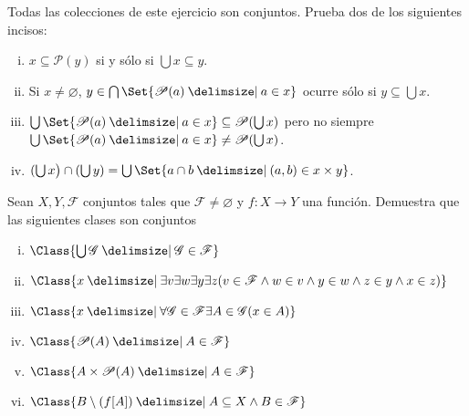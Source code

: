 \documentclass[10pt]{article}
\providecommand\st{}
\newcommand\SetSymbol[1][]{%
    \nonscript\:#1\vert
    \allowbreak
    \nonscript\:
    \mathopen{}}
\renewcommand\st{\SetSymbol[\delimsize]}
\renewcommand\st{\SetSymbol[\delimsize]}
\newcommand{\ms}[1]{\mathscr{#1}}
\renewcommand{\emptyset}{\varnothing}
\begin{document}
    \begin{exercise}
        Todas las colecciones de este ejercicio son conjuntos. Prueba dos de los siguientes incisos:
        \begin{enumerate}[i)]
            \item \(x \subseteq \ms{P}(y)\) si y sólo si \(\bigcup x \subseteq y\).
            \item Si \(x \neq \emptyset\), \(y \in \bigcap\Set{\ms{P}(a) \st a \in x}\) ocurre sólo si \(y \subseteq \bigcup x\).
            \item \( \bigcup \Set{ \ms{P}(a) \st a \in x } \subseteq \ms{P}(\bigcup x) \) pero no siempre \( \bigcup \Set{ \ms{P}(a) \st a \in x } \neq \ms{P}(\bigcup x) \).
            \item \( ( \bigcup x \big) \cap ( \bigcup y ) = \bigcup \Set{ a \cap b \st (a,b) \in x \times y } \).
        \end{enumerate}
    \end{exercise}

    \begin{exercise}
        Sean $X,Y, \ms{F}$ conjuntos tales que $\ms{F}\neq \emptyset$ y $f\colon X\to Y$ una función. Demuestra que las siguientes clases son conjuntos
        \begin{enumerate}[i)]
            \item $\Class{\bigcup \ms{G}\st \ms{G}\in \ms{F}}$
            \item $\Class{x \st \exists v \exists w \exists y \exists z (v\in \ms{F} \wedge w\in v \wedge y \in w \wedge z \in y \wedge x \in z)}$
            \item $\Class{x \st \forall \ms{G} \in \ms{F} \exists A \in \ms{G} (x\in A)}$
            \item $\Class{\ms{P}(A)\st A\in \ms{F}}$
            \item $\Class{A\times \ms{P}(A)\st A\in \ms{F}}$
            \item $\Class{B\setminus(f[A])\st A\subseteq X \wedge B\in \ms{F}}$
        \end{enumerate}
    \end{exercise}
\end{document}
